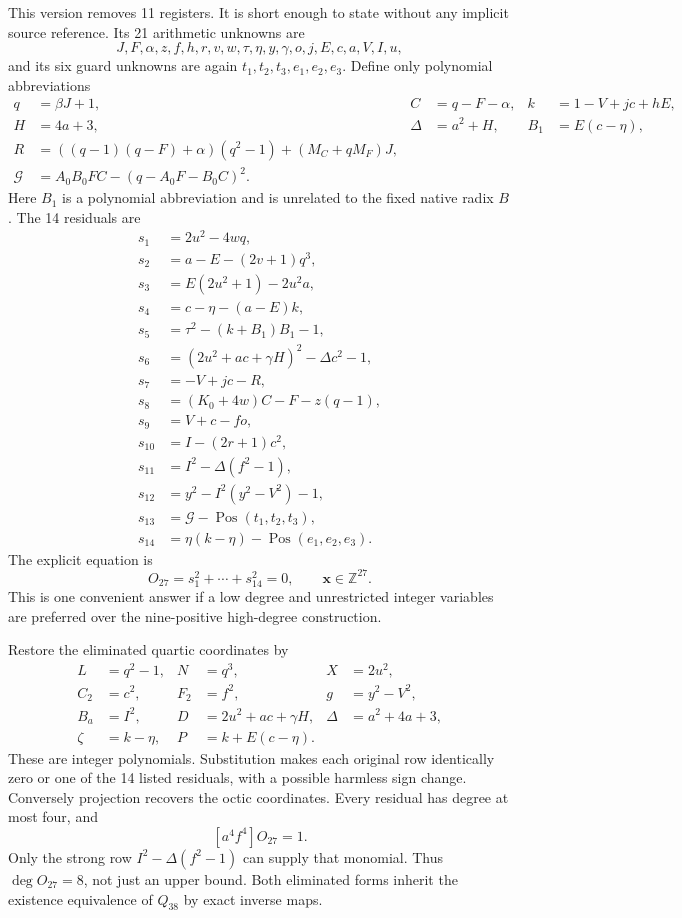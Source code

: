 \documentclass[11pt]{article}
\theoremstyle{definition}\newtheorem{definition}[theorem]{Definition}
\theoremstyle{remark}\newtheorem{remark}[theorem]{Remark}
\newcommand{\Z}{\mathbb Z}
\newcommand{\Pos}{\operatorname{Pos}}
\newcommand{\PhiG}{\mathcal G}
\begin{document}
This version removes 11 registers. It is short enough to state without
any implicit source reference. Its 21 arithmetic unknowns are
\[
 J,F,\alpha,z,f,h,r,v,w,\tau,\eta,y,\gamma,o,j,E,c,a,V,I,u,
\]
and its six guard unknowns are again $t_1,t_2,t_3,e_1,e_2,e_3$.
Define only polynomial abbreviations
\begin{align*}
 q&=\beta J+1,&C&=q-F-\alpha,&k&=1-V+jc+hE,\\
 H&=4a+3,&\Delta&=a^2+H,&B_1&=E(c-\eta),\\
 R&=((q-1)(q-F)+\alpha)(q^2-1)+(M_C+qM_F)J,\\
 \PhiG&=A_0B_0FC-(q-A_0F-B_0C)^2.
\end{align*}
Here $B_1$ is a polynomial abbreviation and is unrelated to the fixed
native radix $B$. The 14 residuals are
\begin{align}
 s_1&=2u^2-4wq,\nonumber\\
 s_2&=a-E-(2v+1)q^3,\nonumber\\
 s_3&=E(2u^2+1)-2u^2a,\nonumber\\
 s_4&=c-\eta-(a-E)k,\nonumber\\
 s_5&=\tau^2-(k+B_1)B_1-1,\nonumber\\
 s_6&=(2u^2+ac+\gamma H)^2-\Delta c^2-1,\nonumber\\
 s_7&=-V+jc-R,\nonumber\\
 s_8&=(K_0+4w)C-F-z(q-1),\nonumber\\
 s_9&=V+c-fo,\nonumber\\
 s_{10}&=I-(2r+1)c^2,\nonumber\\
 s_{11}&=I^2-\Delta(f^2-1),\nonumber\\
 s_{12}&=y^2-I^2(y^2-V^2)-1,\nonumber\\
 s_{13}&=\PhiG-\Pos(t_1,t_2,t_3),\nonumber\\
 s_{14}&=\eta(k-\eta)-\Pos(e_1,e_2,e_3).\label{eq:O27rows}
\end{align}
The explicit equation is
\begin{equation}\label{eq:O27}
 \boxed{O_{27}=s_1^2+\cdots+s_{14}^2=0,\qquad\mathbf x\in\Z^{27}.}
\end{equation}
This is one convenient answer if a low degree and unrestricted integer
variables are preferred over the nine-positive high-degree construction.

Restore the eliminated quartic coordinates by
\begin{align*}
 L&=q^2-1,&N&=q^3,&X&=2u^2,\\
 C_2&=c^2,&F_2&=f^2,&g&=y^2-V^2,\\
 B_a&=I^2,&D&=2u^2+ac+\gamma H,&\Delta&=a^2+4a+3,\\
 \zeta&=k-\eta,&P&=k+E(c-\eta).&&
\end{align*}
These are integer polynomials. Substitution makes each original row
identically zero or one of the 14 listed residuals, with a possible harmless
sign change. Conversely projection recovers the octic coordinates.
Every residual has degree at most four, and
\[
 [a^4f^4]O_{27}=1.
\]
Only the strong row $I^2-\Delta(f^2-1)$ can supply that monomial.
Thus $\deg O_{27}=8$, not just an upper bound. Both eliminated forms inherit
the existence equivalence of $Q_{38}$ by exact inverse maps.
\end{document}
